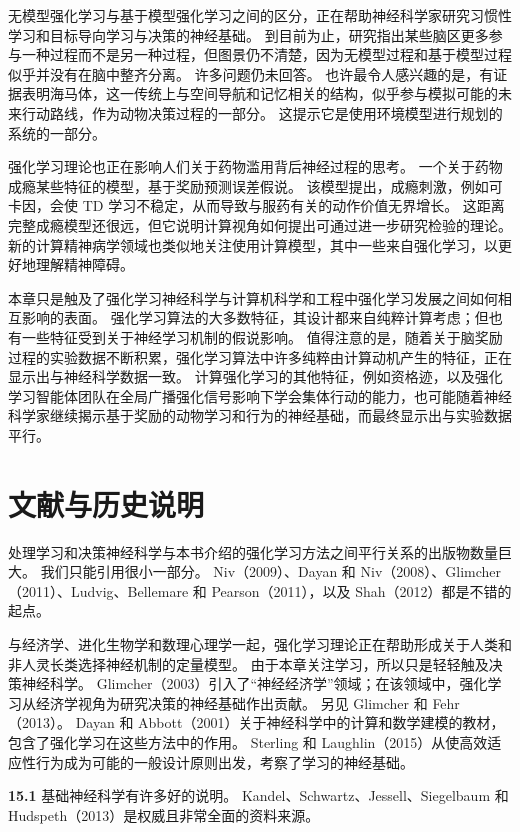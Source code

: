 \documentclass[UTF8,12pt,a4paper,fontset=fandol]{ctexart}
\begin{document}
无模型强化学习与基于模型强化学习之间的区分，正在帮助神经科学家研究习惯性学习和目标导向学习与决策的神经基础。
到目前为止，研究指出某些脑区更多参与一种过程而不是另一种过程，但图景仍不清楚，因为无模型过程和基于模型过程似乎并没有在脑中整齐分离。
许多问题仍未回答。
也许最令人感兴趣的是，有证据表明海马体，这一传统上与空间导航和记忆相关的结构，似乎参与模拟可能的未来行动路线，作为动物决策过程的一部分。
这提示它是使用环境模型进行规划的系统的一部分。

强化学习理论也正在影响人们关于药物滥用背后神经过程的思考。
一个关于药物成瘾某些特征的模型，基于奖励预测误差假说。
该模型提出，成瘾刺激，例如可卡因，会使 TD 学习不稳定，从而导致与服药有关的动作价值无界增长。
这距离完整成瘾模型还很远，但它说明计算视角如何提出可通过进一步研究检验的理论。
新的计算精神病学领域也类似地关注使用计算模型，其中一些来自强化学习，以更好地理解精神障碍。

本章只是触及了强化学习神经科学与计算机科学和工程中强化学习发展之间如何相互影响的表面。
强化学习算法的大多数特征，其设计都来自纯粹计算考虑；但也有一些特征受到关于神经学习机制的假说影响。
值得注意的是，随着关于脑奖励过程的实验数据不断积累，强化学习算法中许多纯粹由计算动机产生的特征，正在显示出与神经科学数据一致。
计算强化学习的其他特征，例如资格迹，以及强化学习智能体团队在全局广播强化信号影响下学会集体行动的能力，也可能随着神经科学家继续揭示基于奖励的动物学习和行为的神经基础，而最终显示出与实验数据平行。

\section*{文献与历史说明}

处理学习和决策神经科学与本书介绍的强化学习方法之间平行关系的出版物数量巨大。
我们只能引用很小一部分。
Niv（2009）、Dayan 和 Niv（2008）、Glimcher（2011）、Ludvig、Bellemare 和 Pearson（2011），以及 Shah（2012）都是不错的起点。

与经济学、进化生物学和数理心理学一起，强化学习理论正在帮助形成关于人类和非人灵长类选择神经机制的定量模型。
由于本章关注学习，所以只是轻轻触及决策神经科学。
Glimcher（2003）引入了“神经经济学”领域；在该领域中，强化学习从经济学视角为研究决策的神经基础作出贡献。
另见 Glimcher 和 Fehr（2013）。
Dayan 和 Abbott（2001）关于神经科学中的计算和数学建模的教材，包含了强化学习在这些方法中的作用。
Sterling 和 Laughlin（2015）从使高效适应性行为成为可能的一般设计原则出发，考察了学习的神经基础。

\noindent\textbf{15.1}
基础神经科学有许多好的说明。
Kandel、Schwartz、Jessell、Siegelbaum 和 Hudspeth（2013）是权威且非常全面的资料来源。
\end{document}
